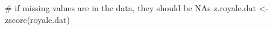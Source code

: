 \begin{Schunk}
\begin{Sinput}
 # if missing values are in the data, they should be NAs
 z.royale.dat <- zscore(royale.dat)
\end{Sinput}
\end{Schunk}
